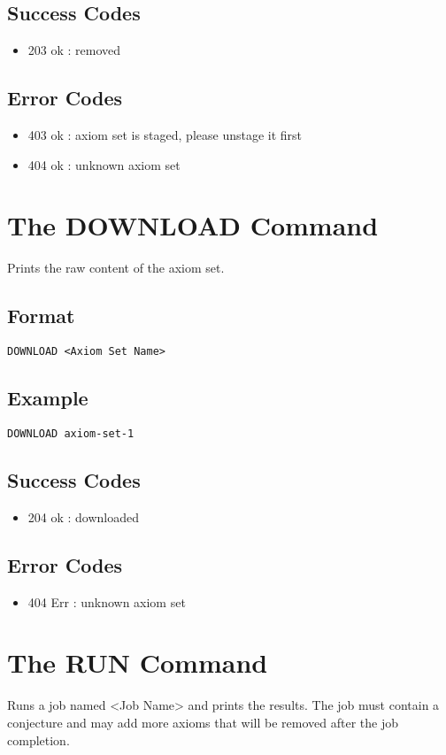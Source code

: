\subsection{Success Codes}
\begin{itemize}
    \item 203 ok : removed
\end{itemize}
\subsection{Error Codes}
\begin{itemize}
    \item 403 ok : axiom set is staged, please unstage it first
    \item 404 ok : unknown axiom set
\end{itemize}
\clearpage

\section{The DOWNLOAD Command}
Prints the raw content of the axiom set.
\subsection{Format}
\begin{lstlisting}
DOWNLOAD <Axiom Set Name>
\end{lstlisting}
\subsection{Example}
\begin{lstlisting}
DOWNLOAD axiom-set-1
\end{lstlisting}
\subsection{Success Codes}
\begin{itemize}
    \item 204 ok : downloaded
\end{itemize}
\subsection{Error Codes}
\begin{itemize}
    \item 404 Err : unknown axiom set
\end{itemize}
\clearpage

\section{The RUN Command}
Runs a job named <Job Name> and prints the results. The job must contain a conjecture and may add more axioms that will be removed after the job completion.
